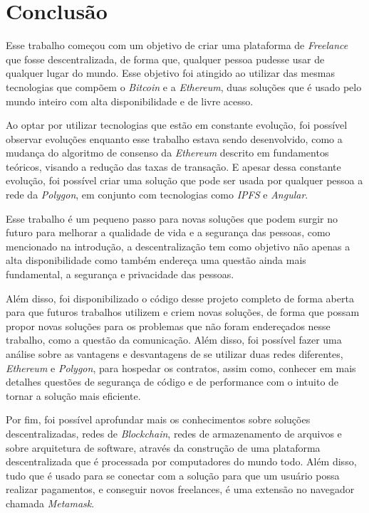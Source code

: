 


\chapter{Conclusão}

Esse trabalho começou com um objetivo de criar uma plataforma de \textit{Freelance} que fosse descentralizada, de forma que, qualquer pessoa pudesse usar de qualquer lugar do mundo. Esse objetivo foi atingido ao utilizar das mesmas tecnologias que compõem o \textit{Bitcoin} e a \textit{Ethereum}, duas soluções que é usado pelo mundo inteiro com alta disponibilidade e de livre acesso.

Ao optar por utilizar tecnologias que estão em constante evolução, foi possível observar evoluções enquanto esse trabalho estava sendo desenvolvido, como a mudança do algoritmo de consenso da \textit{Ethereum} descrito em fundamentos teóricos, visando a redução das taxas de transação. E apesar dessa constante evolução, foi possível criar uma solução que pode ser usada por qualquer pessoa a rede da \textit{Polygon}, em conjunto com tecnologias como \textit{IPFS} e \textit{Angular}.

Esse trabalho é um pequeno passo para novas soluções que podem surgir no futuro para melhorar a qualidade de vida e a segurança das pessoas, como mencionado na introdução, a descentralização tem como objetivo não apenas a alta disponibilidade como também endereça uma questão ainda mais fundamental, a segurança e privacidade das pessoas. 

Além disso, foi disponibilizado o código desse projeto completo de forma aberta para que futuros trabalhos utilizem e criem novas soluções, de forma que possam propor novas soluções para os problemas que não foram endereçados nesse trabalho, como a questão da comunicação. Além disso, foi possível fazer uma análise sobre as vantagens e desvantagens de se utilizar duas redes diferentes, \textit{Ethereum} e \textit{Polygon}, para hospedar os contratos, assim como, conhecer em mais detalhes questões de segurança de código e de performance com o intuito de tornar a solução mais eficiente.

Por fim, foi possível aprofundar mais os conhecimentos sobre soluções descentralizadas, redes de \textit{Blockchain}, redes de armazenamento de arquivos e sobre arquitetura de software, através da construção de uma plataforma descentralizada que é processada por computadores do mundo todo. Além disso, tudo que é usado para se conectar com a solução para que um usuário possa realizar pagamentos, e conseguir novos freelances, é uma extensão no navegador chamada \textit{Metamask}.


